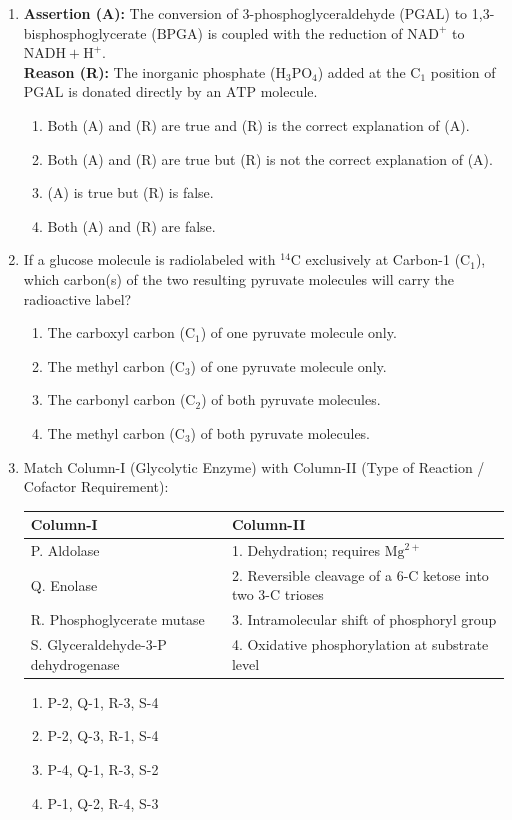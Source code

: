 \documentclass[11pt, a4paper]{article}
\begin{document}
\begin{enumerate}[label=\textbf{\arabic*.}]
\item \textbf{Assertion (A):} The conversion of 3-phosphoglyceraldehyde ($\text{PGAL}$) to 1,3-bisphosphoglycerate ($\text{BPGA}$) is coupled with the reduction of $\text{NAD}^+$ to $\text{NADH} + \text{H}^+$. \\
\textbf{Reason (R):} The inorganic phosphate ($\text{H}_3\text{PO}_4$) added at the $\text{C}_1$ position of $\text{PGAL}$ is donated directly by an $\text{ATP}$ molecule.
\begin{enumerate}[label=(\Alph*)]
    \item Both (A) and (R) are true and (R) is the correct explanation of (A).
    \item Both (A) and (R) are true but (R) is not the correct explanation of (A).
    \item (A) is true but (R) is false.
    \item Both (A) and (R) are false.
\end{enumerate}

\item If a glucose molecule is radiolabeled with $^{14}\text{C}$ exclusively at Carbon-1 ($\text{C}_1$), which carbon(s) of the two resulting pyruvate molecules will carry the radioactive label?
\begin{enumerate}[label=(\Alph*)]
    \item The carboxyl carbon ($\text{C}_1$) of one pyruvate molecule only.
    \item The methyl carbon ($\text{C}_3$) of one pyruvate molecule only.
    \item The carbonyl carbon ($\text{C}_2$) of both pyruvate molecules.
    \item The methyl carbon ($\text{C}_3$) of both pyruvate molecules.
\end{enumerate}

\item Match Column-I (Glycolytic Enzyme) with Column-II (Type of Reaction / Cofactor Requirement):
\begin{center}
\begin{tabular}{|l|l|}
\hline
\textbf{Column-I} & \textbf{Column-II} \\
\hline
P. Aldolase & 1. Dehydration; requires $\text{Mg}^{2+}$ \\
Q. Enolase & 2. Reversible cleavage of a 6-C ketose into two 3-C trioses \\
R. Phosphoglycerate mutase & 3. Intramolecular shift of phosphoryl group \\
S. Glyceraldehyde-3-P dehydrogenase & 4. Oxidative phosphorylation at substrate level \\
\hline
\end{tabular}
\end{center}
\begin{enumerate}[label=(\Alph*)]
    \item P-2, Q-1, R-3, S-4
    \item P-2, Q-3, R-1, S-4
    \item P-4, Q-1, R-3, S-2
    \item P-1, Q-2, R-4, S-3
\end{enumerate}


\end{enumerate}
\end{document}
